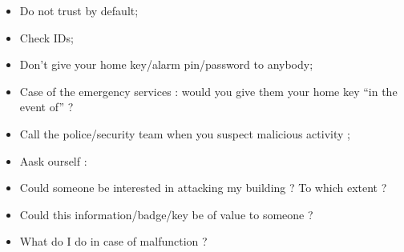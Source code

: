 \documentclass[11pt]{article} %
\begin{document}
\begin{itemize}
\item Do not trust by default;
\item Check IDs;
\item Don't give your home key/alarm pin/password to anybody;
\item Case of the emergency services : would you give them your home key ``in the event of'' ?
\item Call the police/security team when you suspect malicious activity ;
\item Aask ourself : 
\item Could someone be interested in attacking my building ? To which extent ?
\item Could this information/badge/key be of value to someone ?
\item What do I do in case of malfunction ?
\end{itemize}

%
\end{document}
